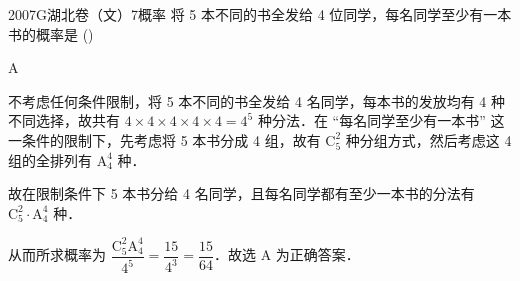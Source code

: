 
\begin{problem}{2007}{G}{湖北卷（文）}{7}{概率}
将 5 本不同的书全发给 4 位同学，每名同学至少有一本书的概率是 (\hspace{1cm})
\begin{choices}
\end{choices}
\end{problem}

\begin{answer}
A
\end{answer}

\begin{solutions}
不考虑任何条件限制，将 5 本不同的书全发给 4 名同学，每本书的发放均有 4 种不同选择，故共有 $ 4\times4\times4\times4\times4=4^5 $ 种分法．在 “每名同学至少有一本书” 这一条件的限制下，先考虑将 5 本书分成 4 组，故有 $ \mathrm{C}_5^2 $ 种分组方式，然后考虑这 4 组的全排列有 $ \mathrm{A}_4^4 $ 种．

故在限制条件下 5 本书分给 4 名同学，且每名同学都有至少一本书的分法有 $ \mathrm{C}_5^2\cdot\mathrm{A}_4^4 $ 种．

从而所求概率为 $ \dfrac{\mathrm{C}_5^2\mathrm{A}_4^4}{4^5}=\dfrac{15}{4^3}=\dfrac{15}{64} $．故选 A 为正确答案．
\end{solutions}